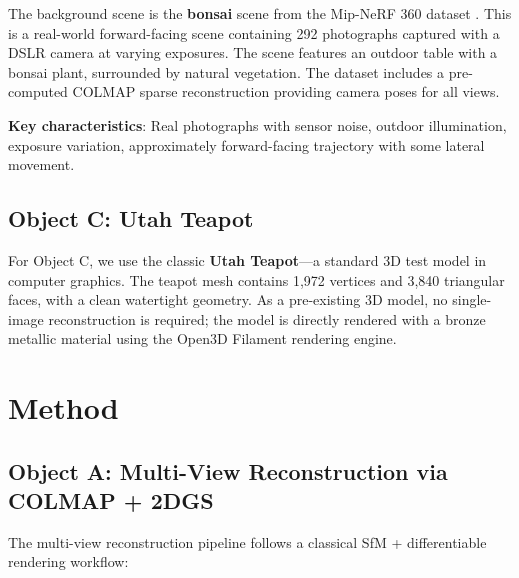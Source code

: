 \documentclass{article}
\begin{document}
The background scene is the \textbf{bonsai} scene from the Mip-NeRF 360 dataset
\cite{barron2022mipnerf360}. This is a real-world forward-facing scene containing
292 photographs captured with a DSLR camera at varying exposures. The scene
features an outdoor table with a bonsai plant, surrounded by natural vegetation.
The dataset includes a pre-computed COLMAP sparse reconstruction providing camera
poses for all views.

\textbf{Key characteristics}: Real photographs with sensor noise, outdoor
illumination, exposure variation, approximately forward-facing trajectory
with some lateral movement.

\subsection{Object C: Utah Teapot}

For Object C, we use the classic \textbf{Utah Teapot}---a standard 3D test model
in computer graphics. The teapot mesh contains 1,972 vertices and 3,840 triangular
faces, with a clean watertight geometry. As a pre-existing 3D model, no
single-image reconstruction is required; the model is directly rendered with
a bronze metallic material using the Open3D Filament rendering engine.

\section{Method}

\subsection{Object A: Multi-View Reconstruction via COLMAP + 2DGS}
\label{sec:object_a}

The multi-view reconstruction pipeline follows a classical SfM + differentiable
rendering workflow:
\end{document}
